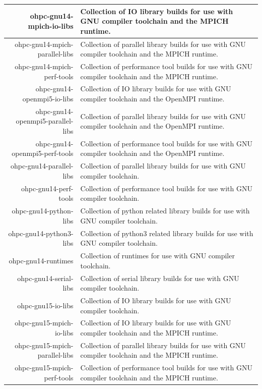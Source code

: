 \begin{tabularx}{\textwidth}{r|X}
\hline
ohpc-gnu14-mpich-io-libs & Collection of IO library builds for use with GNU compiler toolchain and the MPICH runtime. \\
\hline
ohpc-gnu14-mpich-parallel-libs & Collection of parallel library builds for use with GNU compiler toolchain and the MPICH runtime. \\
\hline
ohpc-gnu14-mpich-perf-tools & Collection of performance tool builds for use with GNU compiler toolchain and the MPICH runtime. \\
\hline
ohpc-gnu14-openmpi5-io-libs & Collection of IO library builds for use with GNU compiler toolchain and the OpenMPI runtime. \\
\hline
ohpc-gnu14-openmpi5-parallel-libs & Collection of parallel library builds for use with GNU compiler toolchain and the OpenMPI runtime. \\
\hline
ohpc-gnu14-openmpi5-perf-tools & Collection of performance tool builds for use with GNU compiler toolchain and the OpenMPI runtime. \\
\hline
ohpc-gnu14-parallel-libs & Collection of parallel library builds for use with GNU compiler toolchain. \\
\hline
ohpc-gnu14-perf-tools & Collection of performance tool builds for use with GNU compiler toolchain. \\
\hline
ohpc-gnu14-python-libs & Collection of python related library builds for use with GNU compiler toolchain. \\
\hline
ohpc-gnu14-python3-libs & Collection of python3 related library builds for use with GNU compiler toolchain. \\
\hline
ohpc-gnu14-runtimes & Collection of runtimes for use with GNU compiler toolchain. \\
\hline
ohpc-gnu14-serial-libs & Collection of serial library builds for use with GNU compiler toolchain. \\
\hline
ohpc-gnu15-io-libs & Collection of IO library builds for use with GNU compiler toolchain. \\
\hline
ohpc-gnu15-mpich-io-libs & Collection of IO library builds for use with GNU compiler toolchain and the MPICH runtime. \\
\hline
ohpc-gnu15-mpich-parallel-libs & Collection of parallel library builds for use with GNU compiler toolchain and the MPICH runtime. \\
\hline
ohpc-gnu15-mpich-perf-tools & Collection of performance tool builds for use with GNU compiler toolchain and the MPICH runtime. \\

\end{tabularx}
